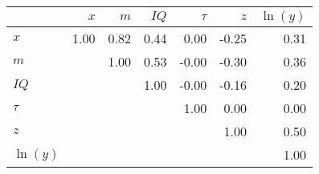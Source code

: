 \begin{tabular}{lrrrrrr}
\hline
 & $x$  & $m$  & $IQ$  & $\tau$  & $z$  & $\ln(y)$  \\ 
\hline
$x$ & 1.00  & 0.82  & 0.44  & 0.00  & -0.25  & 0.31  \\ 
$m$ &   & 1.00  & 0.53  & -0.00  & -0.30  & 0.36  \\ 
$IQ$ &   &   & 1.00  & -0.00  & -0.16  & 0.20  \\ 
$\tau$ &   &   &   & 1.00  & 0.00  & 0.00  \\ 
$z$ &   &   &   &   & 1.00  & 0.50  \\ 
$\ln(y)$ &   &   &   &   &   & 1.00  \\ 
\hline
\end{tabular}%
